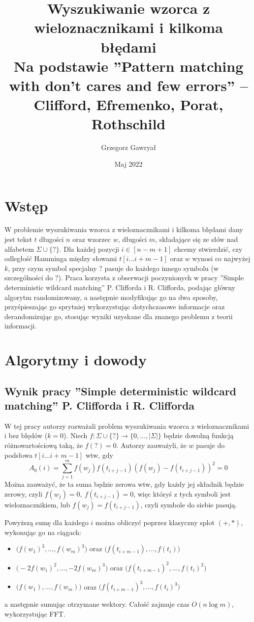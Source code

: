 \documentclass[a4paper,12pt]{article}
\title{Wyszukiwanie wzorca z wieloznacznikami i kilkoma błędami\\ \large Na podstawie ''Pattern matching with don't cares and few errors'' -- Clifford, Efremenko, Porat, Rothschild\cite{pattern_matching_with_dont_cares_and_few_errors}}
\author{Grzegorz Gawryał}
\date{Maj 2022}
\theoremstyle{definition}
\begin{document}
\maketitle

\section{Wstęp}
W problemie wyszukiwania wzorca z wieloznacznikami i kilkoma błędami dany jest tekst $t$ długości $n$ oraz wzorzec $w$, długości $m$, składające się ze słów nad alfabetem $\Sigma \cup \{?\}$. Dla każdej pozycji $i\in [n-m+1]$ chcemy stwierdzić, czy odległość Hamminga między słowami $t[i\dots i+m-1]$ oraz $w$ wynosi co najwyżej $k$, przy czym symbol specjalny $?$ pasuje do każdego innego symbolu (w szczególności do $?$). Praca korzysta z obserwacji poczynionych w pracy ''Simple deterministic wildcard matching'' P. Clifforda i R. Clifforda, podając główny algorytm randomizowany, a następnie modyfikując go na dwa sposoby, przyśpieszając go sprytniej wykorzystując dotychczasowe informacje oraz derandomizując go, stosując wyniki uzyskane dla znanego problemu z teorii informacji.

\section{Algorytmy i dowody}
\subsection{Wynik pracy ''Simple deterministic wildcard matching'' P. Clifforda i R. Clifforda}
W tej pracy autorzy rozważali problem  wyszukiwania wzorca z wieloznacznikami i bez błędów ($k=0$). Niech $f: \Sigma \cup \{?\} \to \{0,\dots, |\Sigma|\}$ będzie dowolną funkcją różnowartościową taką, że $f(?) = 0$.
Autorzy zauważyli, że $w$ pasuje do podsłowa $t[i\dots i+m-1]$ wtw, gdy 
\[A_0(i) = \sum_{j=1}^m f(w_j) f(t_{i+j-1})(f(w_j) - f(t_{i+j-1}))^2 = 0\]
Można zauważyć, że ta suma będzie zerowa wtw, gdy każdy jej składnik będzie zerowy, czyli $f(w_j) = 0,\ f(t_{i+j-1}) = 0$, więc któryś z tych symboli jest wieloznacznikiem, lub $f(w_j) = f(t_{i+j-1})$, czyli symbole do siebie pasują.

Powyższą sumę dla każdego $i$ można obliczyć poprzez klasyczny splot $(+, *)$, wykonując go na ciągach:
\begin{itemize}
    \item $\Big(f(w_1)^3, \dots, f(w_m)^3\Big)$ oraz $\Big(f(t_{i+m-1}), \dots, f(t_{i})\Big)$
    \item $\Big(-2f(w_1)^2, \dots, -2f(w_m)^3\Big)$ oraz $\Big(f(t_{i+m-1})^2, \dots, f(t_{i})^2\Big)$
    \item $\Big(f(w_1), \dots, f(w_m)\Big)$ oraz $\Big(f(t_{i+m-1})^3, \dots, f(t_{i})^3\Big)$
\end{itemize}
a następnie sumując otrzymane wektory. Całość zajmuje czas $O(n \log m)$, wykorzystując FFT.
\end{document}
